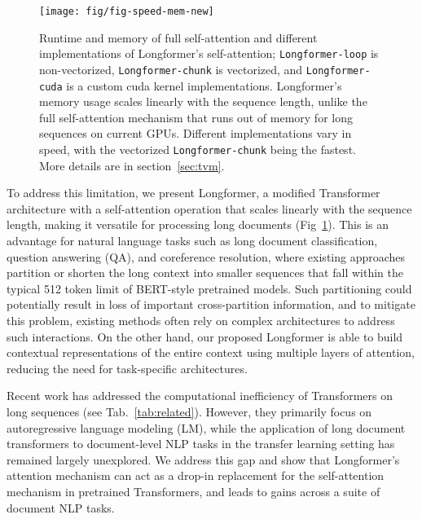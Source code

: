 \documentclass[11pt,a4paper]{article}
\newcommand{\model}{Longformer\xspace}
\begin{document}
\begin{figure}[t!]
    \centering
    \texttt{[image: fig/fig-speed-mem-new]}
    \caption{
Runtime and memory of full self-attention 
and different implementations of \model's self-attention; \texttt{\model-loop} is non-vectorized, \texttt{\model-chunk} is vectorized, and \texttt{\model-cuda} is a custom cuda kernel implementations.  
\model's memory usage scales linearly with the sequence length, unlike the full self-attention mechanism that runs out of memory for long sequences on current GPUs. Different implementations vary in speed, 
with the vectorized \texttt{\model-chunk} being the fastest. More details are in section~\ref{sec:tvm}.
}
    \label{fig:tvm}
\end{figure} 


To address this limitation, we present \model, a modified Transformer architecture
with a self-attention operation that scales linearly with the sequence length, making it versatile for processing long documents (Fig~\ref{fig:tvm}).
This is an advantage for natural language tasks such as long document classification, question answering (QA), and coreference resolution, where existing approaches partition or shorten the long context into smaller sequences that fall within the typical 512 token limit of BERT-style pretrained models. Such partitioning could potentially result in loss of important cross-partition information, and to mitigate this problem, existing methods often rely on complex architectures to address such interactions. On the other hand, our proposed \model is able to build contextual representations of the entire context using multiple layers of attention, reducing the need for task-specific architectures. 

Recent work has addressed the computational inefficiency of Transformers on long sequences (see Tab.~\ref{tab:related}).
However, they primarily focus on autoregressive language modeling (LM), 
while the application of long document transformers to document-level NLP tasks in the transfer learning setting \cite{NIPS2015_5949,Peters2018DeepCW,Howard2018UniversalLM,bert} has remained largely unexplored.  We address this gap and show that \model's attention mechanism can act as a drop-in replacement for the self-attention mechanism in pretrained Transformers, and leads to gains across a suite of document NLP tasks.
\end{document}
